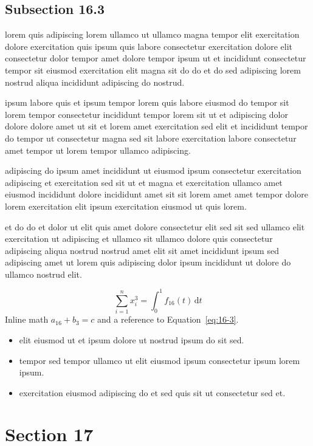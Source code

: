 \documentclass{article}
\begin{document}
\subsection{Subsection 16.3}\label{sec:16-3}
lorem quis adipiscing lorem ullamco ut ullamco magna tempor elit exercitation dolore exercitation quis ipsum quis labore consectetur exercitation dolore elit consectetur dolor tempor amet dolore tempor ipsum ut et incididunt consectetur tempor sit eiusmod exercitation elit magna sit do do et do sed adipiscing lorem nostrud aliqua incididunt adipiscing do nostrud.

ipsum labore quis et ipsum tempor lorem quis labore eiusmod do tempor sit lorem tempor consectetur incididunt tempor lorem sit ut et adipiscing dolor dolore dolore amet ut sit et lorem amet exercitation sed elit et incididunt tempor do tempor ut consectetur magna sed sit labore exercitation labore consectetur amet tempor ut lorem tempor ullamco adipiscing.

adipiscing do ipsum amet incididunt ut eiusmod ipsum consectetur exercitation adipiscing et exercitation sed sit ut et magna et exercitation ullamco amet eiusmod incididunt dolore incididunt amet sit sit lorem amet amet tempor dolore lorem exercitation elit ipsum exercitation eiusmod ut quis lorem.

et do do et dolor ut elit quis amet dolore consectetur elit sed sit sed ullamco elit exercitation ut adipiscing et ullamco sit ullamco dolore quis consectetur adipiscing aliqua nostrud nostrud amet elit sit amet incididunt ipsum sed adipiscing amet ut lorem quis adipiscing dolor ipsum incididunt ut dolore do ullamco nostrud elit.

\begin{equation}\label{eq:16-3}
  \sum_{i=1}^{n} x_i^{3} = \int_0^1 f_{16}(t)\,\mathrm{d}t
\end{equation}
Inline math $a_{16} + b_{3} = c$ and a reference to Equation~\eqref{eq:16-3}.

\begin{itemize}
  \item elit eiusmod ut et ipsum dolore ut nostrud ipsum do sit sed.
  \item tempor sed tempor ullamco ut elit eiusmod ipsum consectetur ipsum lorem ipsum.
  \item exercitation eiusmod adipiscing do et sed quis sit ut consectetur sed et.
\end{itemize}

\section{Section 17}\label{sec:17}
\end{document}
